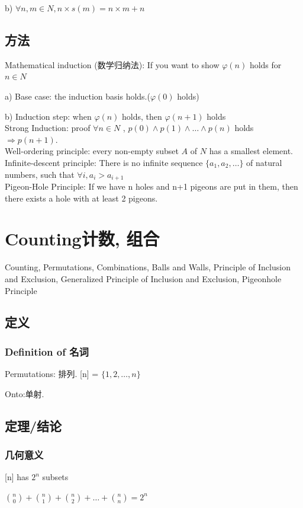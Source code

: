 \documentclass[12pt,a4paper]{ctexrep}
\begin{document}
b) $\forall n,m \in N, n \times s(m) = n \times m + n$
\section{方法}
\noindent Mathematical induction (数学归纳法): If you want to show $\varphi(n)$ holds for $n \in N$ 

a) Base case: the induction basis holds.($\varphi(0)$ holds)

b) Induction step: when $\varphi(n)$ holds, then $\varphi(n+1)$ holds\\
Strong Induction: proof $\forall n \in N$ , $p(0) \wedge p(1) \wedge \dots \wedge p(n)$ holds $\Rightarrow p(n+1)$.\\
Well-ordering principle: every non-empty subset $A$ of $N$ has a smallest element.\\
Infinite-descent principle: There is no infinite sequence $\{a_{1}, a_{2}, \dots \}$ of natural numbers, such that $\forall i, a_{i} > a_{i+1}$\\
Pigeon-Hole Principle: If we have n holes and n+1 pigeons are put in them, then there exists a hole with at least 2 pigeons.

\chapter{Counting计数, 组合}
Counting, Permutations, Combinations, Balls and Walls, Principle of Inclusion and Exclusion, Generalized Principle of Inclusion and Exclusion, Pigeonhole Principle
\section{定义}
\subsection{Definition of 名词}
Permutations: 排列. [n] = $\{1,2,\dots,n\}$

Onto:单射.

\section{定理/结论}
\subsection{几何意义}
[n] has $2^{n}$ subsets

$\binom{n}{0} + \binom{n}{1} + \binom{n}{2} + \dots + \binom{n}{n} = 2^{n}$
\end{document}
